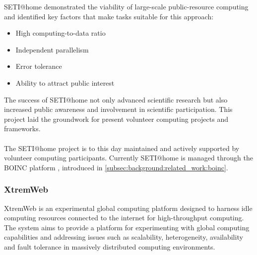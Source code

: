 \ac{SETI}@home demonstrated the viability of large-scale public-resource computing and identified key factors that make tasks suitable for this approach:
\begin{itemize}
  \item High computing-to-data ratio
  \item Independent parallelism
  \item Error tolerance
  \item Ability to attract public interest
\end{itemize}
The success of \ac{SETI}@home not only advanced scientific research but also increased public awareness and involvement in scientific participation. This project laid the groundwork for present volunteer computing projects and frameworks. \cite{relatedwork:seti}
\\~\\
The \ac{SETI}@home project is to this day maintained and actively supported by volunteer computing participants. Currently \ac{SETI}@home is managed through the \acs{BOINC} platform \cite{relatedwork:boinc1}, introduced in \autoref{subsec:background:related_work:boinc}.

\subsubsection{XtremWeb}
\label{subsec:background:related_work:xtremweb}
XtremWeb is an experimental global computing platform designed to harness idle computing resources connected to the internet for high-throughput computing. The system aims to provide a platform for experimenting with global computing capabilities and addressing issues such as scalability, heterogeneity, availability and fault tolerance in massively distributed computing environments. \cite{relatedwork:xtremweb}

